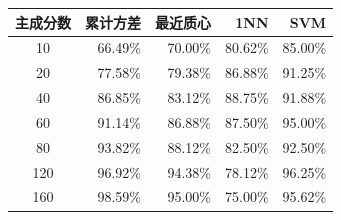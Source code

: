 \begin{tabular}{crrrr}
\toprule
主成分数 & 累计方差 & 最近质心 & 1NN & SVM \\
\midrule
10 & 66.49\% & 70.00\% & 80.62\% & 85.00\% \\
20 & 77.58\% & 79.38\% & 86.88\% & 91.25\% \\
40 & 86.85\% & 83.12\% & 88.75\% & 91.88\% \\
60 & 91.14\% & 86.88\% & 87.50\% & 95.00\% \\
80 & 93.82\% & 88.12\% & 82.50\% & 92.50\% \\
120 & 96.92\% & 94.38\% & 78.12\% & 96.25\% \\
160 & 98.59\% & 95.00\% & 75.00\% & 95.62\% \\
\bottomrule
\end{tabular}
